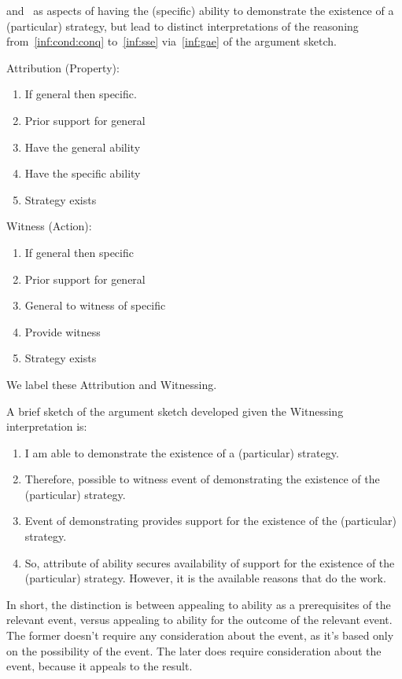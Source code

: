 \documentclass[10pt]{article}
\newcommand{\WR}[0]{\textsf{Witnessing}}
\newcommand{\AR}[0]{\textsf{Attribution}}
\begin{document}
\begin{note}[Expanding]
  \label{Ab:asp:A} and~\label{Ab:asp:W} as aspects of having the (specific) ability to demonstrate the existence of a (particular) strategy, but lead to distinct interpretations of the reasoning from~\ref{inf:cond:conq} to~\ref{inf:sse} via~\ref{inf:gae} of the argument sketch.

  \begin{multicols}{2}
    Attribution (Property):
    \begin{enumerate}
    \item If general then specific.
    \item Prior support for general
    \item Have the general ability
    \item Have the specific ability
    \item Strategy exists
    \end{enumerate}

    Witness (Action):
    \begin{enumerate}
    \item If general then specific
    \item Prior support for general
    \item General to witness of specific
    \item Provide witness
    \item Strategy exists
    \end{enumerate}
  \end{multicols}
  We label these \AR{} and \WR{}.
\end{note}

\begin{note}[\WR{}]
  A brief sketch of the argument sketch developed given the \WR{} interpretation is:
  \begin{enumerate}[label=(W\arabic*), ref=(W\arabic*)]
  \item I am able to demonstrate the existence of a (particular) strategy.
  \item Therefore, possible to witness event of demonstrating the existence of the (particular) strategy.
  \item Event of demonstrating provides support for the existence of the (particular) strategy.
  \item So, attribute of ability secures availability of support for the existence of the (particular) strategy.
    However, it is the available reasons that do the work.
  \end{enumerate}

  In short, the distinction is between appealing to ability as a prerequisites of the relevant event, versus appealing to ability for the outcome of the relevant event.
  The former doesn't require any consideration about the event, as it's based only on the possibility of the event.
  The later does require consideration about the event, because it appeals to the result.
\end{note}
\end{document}
